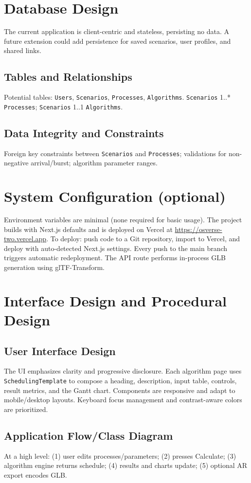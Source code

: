 \documentclass[12pt,a4paper,oneside]{report}
\newcommand{\projectURL}{https://osverse-two.vercel.app}
\begin{document}
\section{Database Design}
The current application is client-centric and stateless, persisting no data. A future extension could add persistence for saved scenarios, user profiles, and shared links.
\subsection{Tables and Relationships}
Potential tables: \texttt{Users}, \texttt{Scenarios}, \texttt{Processes}, \texttt{Algorithms}. \texttt{Scenarios} 1..* \texttt{Processes}; \texttt{Scenarios} 1..1 \texttt{Algorithms}.
\subsection{Data Integrity and Constraints}
Foreign key constraints between \texttt{Scenarios} and \texttt{Processes}; validations for non-negative arrival/burst; algorithm parameter ranges.

\section{System Configuration (optional)}
Environment variables are minimal (none required for basic usage). The project builds with Next.js defaults and is deployed on Vercel at \href{\projectURL}{\projectURL}. To deploy: push code to a Git repository, import to Vercel, and deploy with auto-detected Next.js settings. Every push to the main branch triggers automatic redeployment. The API route performs in-process GLB generation using glTF-Transform.

\section{Interface Design and Procedural Design}
\subsection{User Interface Design}
The UI emphasizes clarity and progressive disclosure. Each algorithm page uses \verb|SchedulingTemplate| to compose a heading, description, input table, controls, result metrics, and the Gantt chart. Components are responsive and adapt to mobile/desktop layouts. Keyboard focus management and contrast-aware colors are prioritized.

\subsection{Application Flow/Class Diagram}
At a high level: (1) user edits processes/parameters; (2) presses Calculate; (3) algorithm engine returns schedule; (4) results and charts update; (5) optional AR export encodes GLB.
\end{document}
